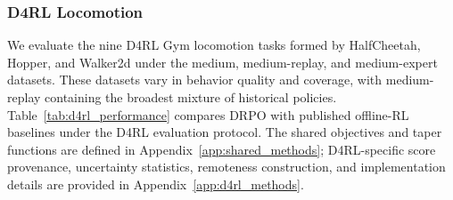 \subsubsection{D4RL Locomotion}
\label{sec:d4rl_performance}

We evaluate the nine D4RL Gym locomotion tasks formed by HalfCheetah,
Hopper, and Walker2d under the medium, medium-replay, and medium-expert
datasets. These datasets vary in behavior quality and coverage, with
medium-replay containing the broadest mixture of historical policies.
Table~\ref{tab:d4rl_performance} compares DRPO with published offline-RL
baselines under the D4RL evaluation protocol. The shared objectives and
taper functions are defined in Appendix~\ref{app:shared_methods};
D4RL-specific score provenance, uncertainty statistics, remoteness
construction, and implementation details are provided in
Appendix~\ref{app:d4rl_methods}.

